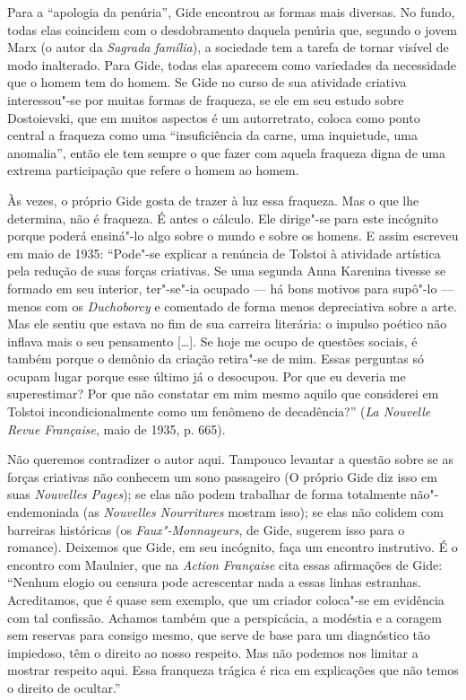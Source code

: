 Para a ``apologia da penúria'', Gide encontrou as formas mais diversas.
No fundo, todas elas coincidem com o desdobramento daquela penúria que,
segundo o jovem Marx (o autor da \emph{Sagrada família}), a sociedade
tem a tarefa de tornar visível de modo inalterado. Para Gide, todas elas
aparecem como variedades da necessidade que o homem tem do homem. Se
Gide no curso de sua atividade criativa interessou"-se por muitas formas
de fraqueza, se ele em seu estudo sobre Dostoievski, que em muitos
aspectos é um autorretrato, coloca como ponto central a fraqueza como
uma ``insuficiência da carne, uma inquietude, uma anomalia'', então ele
tem sempre o que fazer com aquela fraqueza digna de uma extrema
participação que refere o homem ao homem.

Às vezes, o próprio Gide gosta de trazer à luz essa fraqueza. Mas o que
lhe determina, não é fraqueza. É antes o cálculo. Ele dirige"-se para
este incógnito porque poderá ensiná"-lo algo sobre o mundo e sobre os
homens. E assim escreveu em maio de 1935: ``Pode"-se explicar a renúncia
de Tolstoi à atividade artística pela redução de suas forças criativas.
Se uma segunda Anna Karenina tivesse se formado em seu interior,
ter"-se"-ia ocupado --- há bons motivos para supô"-lo --- menos com os
\emph{Duchoborcy} e comentado de forma menos depreciativa sobre a arte.
Mas ele sentiu que estava no fim de sua carreira literária: o impulso
poético não inflava mais o seu pensamento [\ldots{}]. Se hoje me ocupo de
questões sociais, é também porque o demônio da criação retira"-se de mim.
Essas perguntas só ocupam lugar porque esse último já o desocupou. Por
que eu deveria me superestimar? Por que não constatar em mim mesmo
aquilo que considerei em Tolstoi incondicionalmente como um fenômeno de
decadência?'' (\emph{La Nouvelle Revue Française}, maio de 1935, p.
665).

Não queremos contradizer o autor aqui. Tampouco levantar a questão sobre
se as forças criativas não conhecem um sono passageiro (O próprio Gide
diz isso em suas \emph{Nouvelles Pages}); se elas não podem trabalhar de
forma totalmente não"-endemoniada (as \emph{Nouvelles Nourritures}
mostram isso); se elas não colidem com barreiras históricas (os
\emph{Faux"-Monnayeurs}, de Gide, sugerem isso para o romance). Deixemos
que Gide, em seu incógnito, faça um encontro instrutivo. É o encontro
com Maulnier, que na \emph{Action Française} cita essas afirmações de
Gide: ``Nenhum elogio ou censura pode acrescentar nada a essas linhas
estranhas. Acreditamos, que é quase sem exemplo, que um criador
coloca"-se em evidência com tal confissão. Achamos também que a
perspicácia, a modéstia e a coragem sem reservas para consigo mesmo, que
serve de base para um diagnóstico tão impiedoso, têm o direito ao nosso
respeito. Mas não podemos nos limitar a mostrar respeito aqui. Essa
franqueza trágica é rica em explicações que não temos o direito de
ocultar.''

